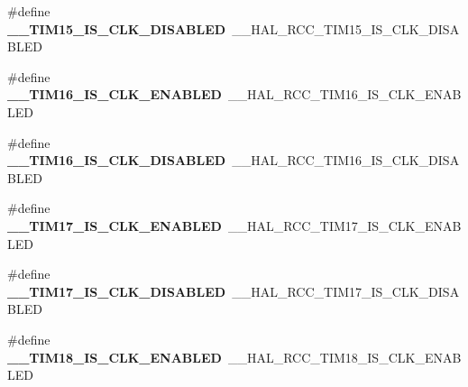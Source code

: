 \begin{DoxyCompactItemize}
\item 
\hypertarget{group___h_a_l___r_c_c___aliased_gae23f2016afbcc226f8eb5c22739ff33e}{\#define {\bfseries \-\_\-\-\_\-\-T\-I\-M15\-\_\-\-I\-S\-\_\-\-C\-L\-K\-\_\-\-D\-I\-S\-A\-B\-L\-E\-D}~\-\_\-\-\_\-\-H\-A\-L\-\_\-\-R\-C\-C\-\_\-\-T\-I\-M15\-\_\-\-I\-S\-\_\-\-C\-L\-K\-\_\-\-D\-I\-S\-A\-B\-L\-E\-D}\label{group___h_a_l___r_c_c___aliased_gae23f2016afbcc226f8eb5c22739ff33e}

\item 
\hypertarget{group___h_a_l___r_c_c___aliased_gaf37f50c5f648828da154ddad55c82d0e}{\#define {\bfseries \-\_\-\-\_\-\-T\-I\-M16\-\_\-\-I\-S\-\_\-\-C\-L\-K\-\_\-\-E\-N\-A\-B\-L\-E\-D}~\-\_\-\-\_\-\-H\-A\-L\-\_\-\-R\-C\-C\-\_\-\-T\-I\-M16\-\_\-\-I\-S\-\_\-\-C\-L\-K\-\_\-\-E\-N\-A\-B\-L\-E\-D}\label{group___h_a_l___r_c_c___aliased_gaf37f50c5f648828da154ddad55c82d0e}

\item 
\hypertarget{group___h_a_l___r_c_c___aliased_ga74fe7a2ca9ea8792a67e08e34c4b25b5}{\#define {\bfseries \-\_\-\-\_\-\-T\-I\-M16\-\_\-\-I\-S\-\_\-\-C\-L\-K\-\_\-\-D\-I\-S\-A\-B\-L\-E\-D}~\-\_\-\-\_\-\-H\-A\-L\-\_\-\-R\-C\-C\-\_\-\-T\-I\-M16\-\_\-\-I\-S\-\_\-\-C\-L\-K\-\_\-\-D\-I\-S\-A\-B\-L\-E\-D}\label{group___h_a_l___r_c_c___aliased_ga74fe7a2ca9ea8792a67e08e34c4b25b5}

\item 
\hypertarget{group___h_a_l___r_c_c___aliased_ga7607b2ea34cb142f526c9e771a854777}{\#define {\bfseries \-\_\-\-\_\-\-T\-I\-M17\-\_\-\-I\-S\-\_\-\-C\-L\-K\-\_\-\-E\-N\-A\-B\-L\-E\-D}~\-\_\-\-\_\-\-H\-A\-L\-\_\-\-R\-C\-C\-\_\-\-T\-I\-M17\-\_\-\-I\-S\-\_\-\-C\-L\-K\-\_\-\-E\-N\-A\-B\-L\-E\-D}\label{group___h_a_l___r_c_c___aliased_ga7607b2ea34cb142f526c9e771a854777}

\item 
\hypertarget{group___h_a_l___r_c_c___aliased_gab464919b131d5b3cb1799e5c306e8cb0}{\#define {\bfseries \-\_\-\-\_\-\-T\-I\-M17\-\_\-\-I\-S\-\_\-\-C\-L\-K\-\_\-\-D\-I\-S\-A\-B\-L\-E\-D}~\-\_\-\-\_\-\-H\-A\-L\-\_\-\-R\-C\-C\-\_\-\-T\-I\-M17\-\_\-\-I\-S\-\_\-\-C\-L\-K\-\_\-\-D\-I\-S\-A\-B\-L\-E\-D}\label{group___h_a_l___r_c_c___aliased_gab464919b131d5b3cb1799e5c306e8cb0}

\item 
\hypertarget{group___h_a_l___r_c_c___aliased_ga689f73387fa43ec3bd6e2ffc45d6c720}{\#define {\bfseries \-\_\-\-\_\-\-T\-I\-M18\-\_\-\-I\-S\-\_\-\-C\-L\-K\-\_\-\-E\-N\-A\-B\-L\-E\-D}~\-\_\-\-\_\-\-H\-A\-L\-\_\-\-R\-C\-C\-\_\-\-T\-I\-M18\-\_\-\-I\-S\-\_\-\-C\-L\-K\-\_\-\-E\-N\-A\-B\-L\-E\-D}\label{group___h_a_l___r_c_c___aliased_ga689f73387fa43ec3bd6e2ffc45d6c720}


\end{DoxyCompactItemize}
